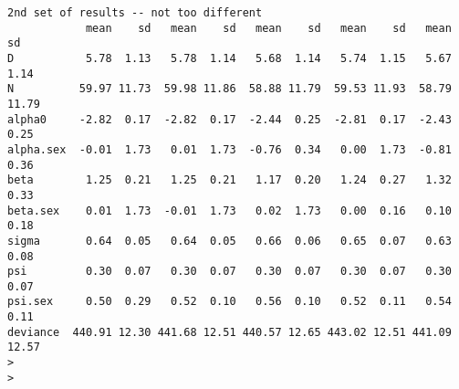 \begin{verbatim}
2nd set of results -- not too different
            mean    sd   mean    sd   mean    sd   mean    sd   mean    sd
D           5.78  1.13   5.78  1.14   5.68  1.14   5.74  1.15   5.67  1.14
N          59.97 11.73  59.98 11.86  58.88 11.79  59.53 11.93  58.79 11.79
alpha0     -2.82  0.17  -2.82  0.17  -2.44  0.25  -2.81  0.17  -2.43  0.25
alpha.sex  -0.01  1.73   0.01  1.73  -0.76  0.34   0.00  1.73  -0.81  0.36
beta        1.25  0.21   1.25  0.21   1.17  0.20   1.24  0.27   1.32  0.33
beta.sex    0.01  1.73  -0.01  1.73   0.02  1.73   0.00  0.16   0.10  0.18
sigma       0.64  0.05   0.64  0.05   0.66  0.06   0.65  0.07   0.63  0.08
psi         0.30  0.07   0.30  0.07   0.30  0.07   0.30  0.07   0.30  0.07
psi.sex     0.50  0.29   0.52  0.10   0.56  0.10   0.52  0.11   0.54  0.11
deviance  440.91 12.30 441.68 12.51 440.57 12.65 443.02 12.51 441.09 12.57
> 
> 
\end{verbatim}


